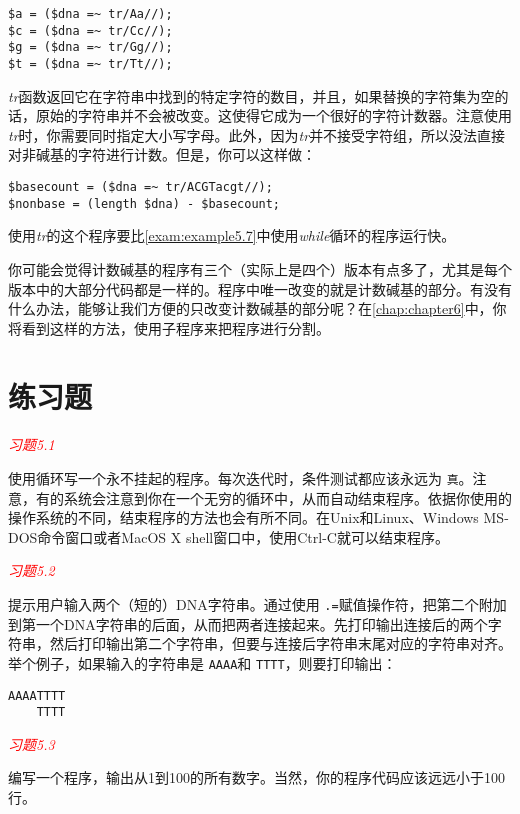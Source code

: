 \begin{lstlisting}
$a = ($dna =~ tr/Aa//);
$c = ($dna =~ tr/Cc//);
$g = ($dna =~ tr/Gg//);
$t = ($dna =~ tr/Tt//);
\end{lstlisting}

\textit{tr}函数返回它在字符串中找到的特定字符的数目，并且，如果替换的字符集为空的话，原始的字符串并不会被改变。这使得它成为一个很好的字符计数器。注意使用\textit{tr}时，你需要同时指定大小写字母。此外，因为\textit{tr}并不接受字符组，所以没法直接对非碱基的字符进行计数。但是，你可以这样做：

\begin{lstlisting}
$basecount = ($dna =~ tr/ACGTacgt//);
$nonbase = (length $dna) - $basecount;
\end{lstlisting}

使用\textit{tr}的这个程序要比\autoref{exam:example5.7}中使用\textit{while}循环的程序运行快。

你可能会觉得计数碱基的程序有三个（实际上是四个）版本有点多了，尤其是每个版本中的大部分代码都是一样的。程序中唯一改变的就是计数碱基的部分。有没有什么办法，能够让我们方便的只改变计数碱基的部分呢？在\autoref{chap:chapter6}中，你将看到这样的方法，使用子程序来把程序进行分割。

\section{练习题}
\textcolor{red}{\textit{习题5.1}}
\begin{adjustwidth}{4em}{}
使用循环写一个永不挂起的程序。每次迭代时，条件测试都应该永远为 \verb|真|。注意，有的系统会注意到你在一个无穷的循环中，从而自动结束程序。依据你使用的操作系统的不同，结束程序的方法也会有所不同。在Unix和Linux、Windows
MS-DOS命令窗口或者MacOS X shell窗口中，使用Ctrl-C就可以结束程序。
\end{adjustwidth}

\textcolor{red}{\textit{习题5.2}}
\begin{adjustwidth}{4em}{}
提示用户输入两个（短的）DNA字符串。通过使用 \verb|.=|赋值操作符，把第二个附加到第一个DNA字符串的后面，从而把两者连接起来。先打印输出连接后的两个字符串，然后打印输出第二个字符串，但要与连接后字符串末尾对应的字符串对齐。举个例子，如果输入的字符串是 \verb|AAAA|和 \verb|TTTT|，则要打印输出：
\begin{verbatim}
AAAATTTT
    TTTT
\end{verbatim}
\end{adjustwidth}

\textcolor{red}{\textit{习题5.3}}
\begin{adjustwidth}{4em}{}
编写一个程序，输出从1到100的所有数字。当然，你的程序代码应该远远小于100行。
\end{adjustwidth}

